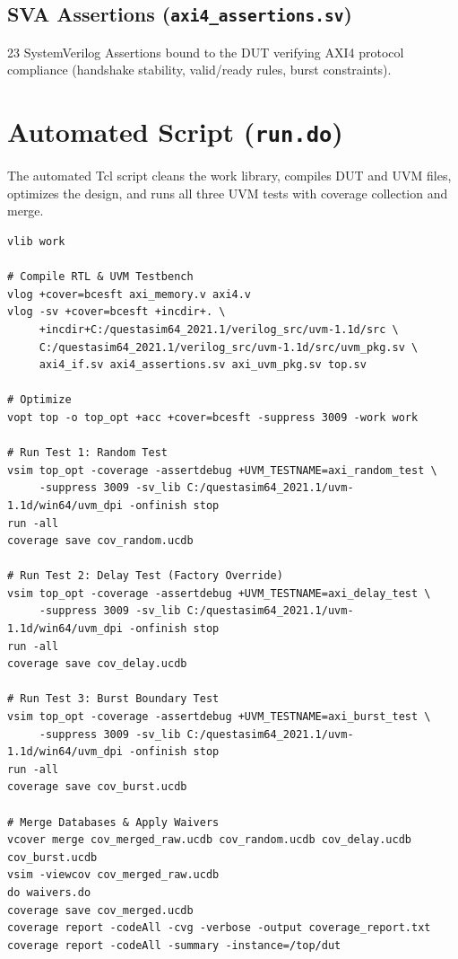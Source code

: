 \documentclass[10pt,a4paper]{article}
\begin{document}
\subsection{SVA Assertions (\texttt{axi4\_assertions.sv})}
23 SystemVerilog Assertions bound to the DUT verifying AXI4 protocol compliance (handshake stability, valid/ready rules, burst constraints).

\section{Automated Script (\texttt{run.do})}
The automated Tcl script cleans the work library, compiles DUT and UVM files, optimizes the design, and runs all three UVM tests with coverage collection and merge.

\begin{lstlisting}[style=svstyle, caption=Automated QuestaSim Script (\texttt{run.do})]
vlib work

# Compile RTL & UVM Testbench
vlog +cover=bcesft axi_memory.v axi4.v
vlog -sv +cover=bcesft +incdir+. \
     +incdir+C:/questasim64_2021.1/verilog_src/uvm-1.1d/src \
     C:/questasim64_2021.1/verilog_src/uvm-1.1d/src/uvm_pkg.sv \
     axi4_if.sv axi4_assertions.sv axi_uvm_pkg.sv top.sv

# Optimize
vopt top -o top_opt +acc +cover=bcesft -suppress 3009 -work work

# Run Test 1: Random Test
vsim top_opt -coverage -assertdebug +UVM_TESTNAME=axi_random_test \
     -suppress 3009 -sv_lib C:/questasim64_2021.1/uvm-1.1d/win64/uvm_dpi -onfinish stop
run -all
coverage save cov_random.ucdb

# Run Test 2: Delay Test (Factory Override)
vsim top_opt -coverage -assertdebug +UVM_TESTNAME=axi_delay_test \
     -suppress 3009 -sv_lib C:/questasim64_2021.1/uvm-1.1d/win64/uvm_dpi -onfinish stop
run -all
coverage save cov_delay.ucdb

# Run Test 3: Burst Boundary Test
vsim top_opt -coverage -assertdebug +UVM_TESTNAME=axi_burst_test \
     -suppress 3009 -sv_lib C:/questasim64_2021.1/uvm-1.1d/win64/uvm_dpi -onfinish stop
run -all
coverage save cov_burst.ucdb

# Merge Databases & Apply Waivers
vcover merge cov_merged_raw.ucdb cov_random.ucdb cov_delay.ucdb cov_burst.ucdb
vsim -viewcov cov_merged_raw.ucdb
do waivers.do
coverage save cov_merged.ucdb
coverage report -codeAll -cvg -verbose -output coverage_report.txt
coverage report -codeAll -summary -instance=/top/dut
\end{lstlisting}
\end{document}
